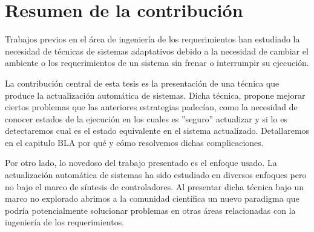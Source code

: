 \section{Resumen de la contribución}

Trabajos previos en el área de ingeniería de los requerimientos han estudiado la necesidad de técnicas de sistemas
adaptativos debido a la necesidad de cambiar el ambiente o los requerimientos de un sistema sin frenar o interrumpir su
ejecución.

La contribución central de esta tesis es la presentación de una técnica que produce la actualización automática de
sistemas. Dicha técnica, propone mejorar ciertos problemas que las anteriores estrategias padecían, como la necesidad de
conocer estados de la ejecución en los cuales es ''seguro'' actualizar y si lo es detectaremos cual es el estado
equivalente en el sistema actualizado. Detallaremos en el capitulo BLA por qué y cómo resolvemos dichas complicaciones.

Por otro lado, lo novedoso del trabajo presentado es el enfoque usado. La actualización automática de sistemas ha sido
estudiado en diversos enfoques pero no bajo el marco de síntesis de controladores. Al presentar dicha técnica bajo un
marco no explorado abrimos a la comunidad científica un nuevo paradigma que podría potencialmente solucionar problemas
en otras áreas relacionadas con la ingeniería de los requerimientos.

